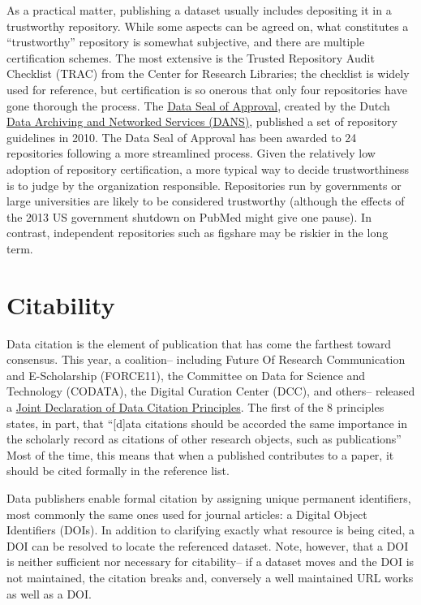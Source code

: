 \documentclass[10pt,twocolumn]{article}
\begin{document}
As a practical matter, publishing a dataset usually includes depositing it in a trustworthy repository.
While some aspects can be agreed on, what constitutes a ``trustworthy'' repository is somewhat subjective, and there are multiple certification schemes.
The most extensive is the Trusted Repository Audit Checklist (TRAC)\cite{dale_trustworthy_2007} from the Center for Research Libraries; the checklist is widely used for reference, but certification is so onerous that only four repositories have gone thorough the process.
The \href{http://datasealofapproval.org/}{Data Seal of Approval}, created by the Dutch \href{http://www.dans.knaw.nl/en}{Data Archiving and Networked Services (DANS)}, published a set of repository guidelines in 2010. 
The Data Seal of Approval has been awarded to 24 repositories following a more streamlined process.
Given the relatively low adoption of repository certification, a more typical way to decide trustworthiness is to judge by the organization responsible.
Repositories run by governments or large universities are likely to be considered trustworthy (although the effects of the 2013 US government shutdown on PubMed might give one pause).
In contrast, independent repositories such as figshare may be riskier in the long term. %

\section*{Citability}\label{citability}

Data citation is the element of publication that has come the farthest toward consensus.
This year, a coalition– including Future Of Research Communication and E-Scholarship (FORCE11)\cite{bourne_improving_2012}, the Committee on Data for Science and Technology (CODATA)\cite{codata-icsti_task_group_on_data_citation_standards_and_practices_out_2013}, the Digital Curation Center (DCC), and others– released a \href{http://www.force11.org/datacitation}{Joint Declaration of Data Citation Principles}.
The first of the 8 principles states, in part, that ``[d]ata citations should be accorded the same importance in the scholarly record as citations of other research objects, such as publications''
Most of the time, this means that when a published contributes to a paper, it should be cited formally in the reference list.
	
Data publishers enable formal citation by assigning unique permanent identifiers, most commonly the same ones used for journal articles: a Digital Object Identifiers (DOIs).
In addition to clarifying exactly what resource is being cited, a DOI can be resolved to locate the referenced dataset.
Note, however, that a DOI is neither sufficient nor necessary for citability-- if a dataset moves and the DOI is not maintained, the citation breaks and, conversely a well maintained URL works as well as a DOI.
\end{document}
